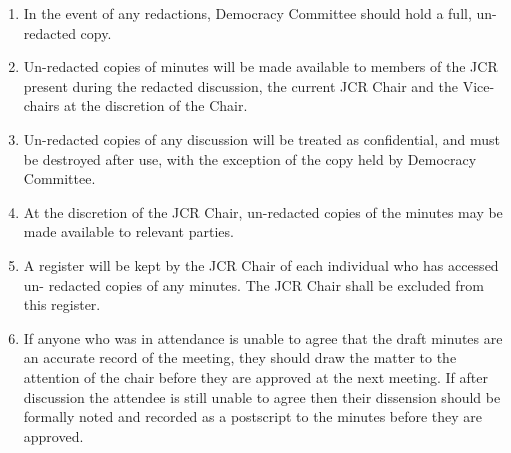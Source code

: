 \begin{enumerate}
\begin{enumerate}
\begin{enumerate}
            \item In the event of any redactions, Democracy Committee should hold a full, un- redacted copy. \item Un-redacted copies of minutes will be made available to members of the JCR present during the
            redacted discussion, the current JCR Chair and the Vice-chairs at the discretion of the Chair.
            \item Un-redacted copies of any discussion will be treated as confidential, and must be destroyed after use, with the exception of the copy held by Democracy Committee.
            \item At the discretion of the JCR Chair, un-redacted copies of the minutes may be made available to relevant parties.
            \item A register will be kept by the JCR Chair of each individual who has accessed un- redacted copies of any minutes. The JCR Chair shall be excluded from this register.
            \item If anyone who was in attendance is unable to agree that the draft minutes are an accurate record of the meeting, they should draw the matter to the attention of the chair before they are approved at the next meeting. If after discussion the attendee is still unable to agree then their dissension should be formally noted and recorded as a postscript to the minutes before they are approved.
        \end{enumerate}
    \end{enumerate}
\end{enumerate}

